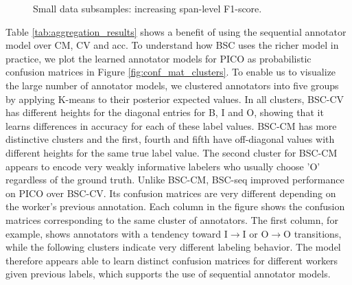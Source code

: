 \begin{figure}[ht]
{}
\caption{Small data subsamples: increasing span-level F1-score.
}
\label{fig:alner}
\end{figure}
Table \ref{tab:aggregation_results} shows a benefit of using the sequential annotator model over CM, CV and acc.
To understand how BSC uses the richer model in practice, we plot the learned
 annotator models for
PICO as probabilistic confusion matrices in Figure \ref{fig:conf_mat_clusters}.
To enable us to visualize the large number of annotator models, we clustered 
annotators into five groups by applying K-means to their posterior expected values.
In all clusters, BSC-CV has different heights for the diagonal entries for  B, I and O,
showing that it learns differences in accuracy for each of these label values.
BSC-CM has more distinctive clusters and the first, fourth and fifth  
have off-diagonal values with different heights for the same true label value. The second 
cluster for BSC-CM appears to encode very weakly informative labelers who usually choose 'O' regardless of the 
ground truth. 
Unlike BSC-CM, BSC-seq improved performance on PICO over BSC-CV. Its confusion matrices are
very different depending on the worker's previous annotation. 
Each column in the figure shows the confusion matrices corresponding to the same cluster of annotators. 
The first column, for example, shows
annotators with a tendency toward I$\rightarrow$I or O$\rightarrow$O transitions, while the following clusters 
indicate very different labeling behavior. The model therefore appears able to learn
distinct confusion matrices for different workers given previous labels, which supports the use of sequential
annotator models.

